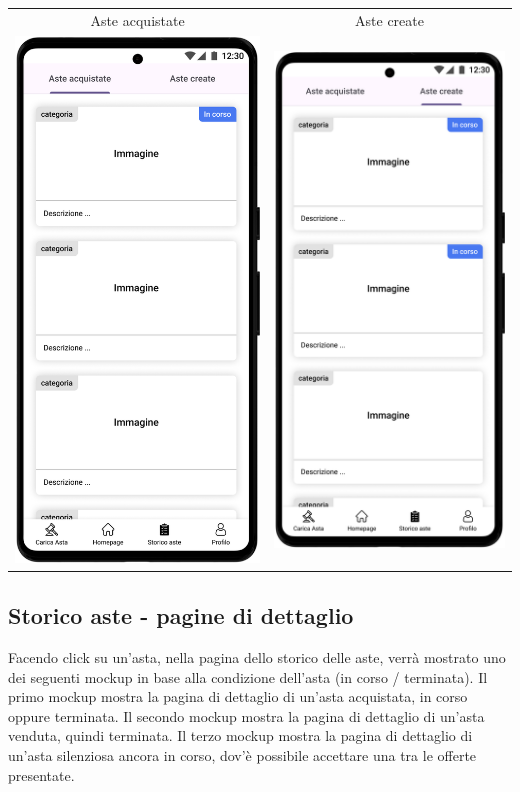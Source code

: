 \begin{center}
	\begin{tabular}{cc}
		Aste acquistate                                                                    &
		Aste create                                                                          \\
		\includegraphics[width=.35\textwidth]{assets/mockup/Storico aste - acquistate.png} &
		\includegraphics[width=.35\textwidth]{assets/mockup/Storico aste - create.png}       \\
	\end{tabular}
\end{center}

\newpage
\subsection{Storico aste - pagine di dettaglio}
Facendo click su un'asta, nella pagina dello storico delle aste, verrà mostrato uno dei seguenti mockup in base alla condizione dell'asta (in corso / terminata).\meskip
Il primo mockup mostra la pagina di dettaglio di un'asta acquistata, in corso oppure terminata.\meskip
Il secondo mockup mostra la pagina di dettaglio di un'asta venduta, quindi terminata.\meskip
Il terzo mockup mostra la pagina di dettaglio di un'asta silenziosa ancora in corso, dov'è possibile accettare una tra le offerte presentate.

